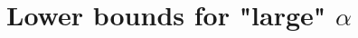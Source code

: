 \documentclass[12pt,]{article}
\newtheorem{lemma}[theorem]{Lemma}
\theoremstyle{definition}
\theoremstyle{remark}
\newcommand{\cG}{{\cal G}}
\newcommand{\cV}{{\cal V}}
\newcommand{\0}{\mathbf{0}}
\renewcommand{\le}{\leq}
\renewcommand{\ge}{\geq}
\newcommand{\bi}{{\overline {\imath}}}
\newcommand{\bj}{{\overline  {\jmath}}}
\begin{document}
\section{Lower bounds for "large" \texorpdfstring{$\alpha$}{a}}


%
%
%
%
%
%
%
%
\end{document}
